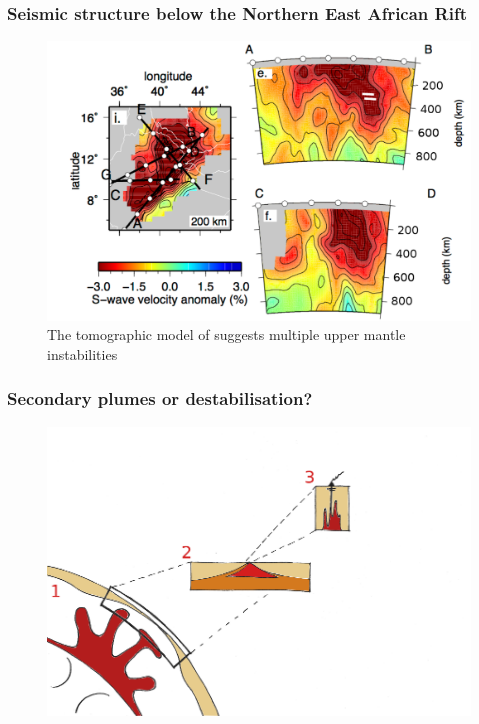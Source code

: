 \documentclass[aspectratio=169]{beamer}
\begin{document}
\begin{frame}
    \frametitle{Seismic structure below the Northern East African Rift}
    \begin{figure}
        \vspace{-0.3cm}
        \includegraphics[height=0.7\paperheight]{./figures/chiara1.png}
        \caption{The tomographic model of \cite{civiero-etal-2016} suggests multiple upper mantle instabilities}
    \end{figure}
\end{frame}

\begin{frame}
    \frametitle{Secondary plumes or destabilisation?}
    \begin{figure}
        \includegraphics[height=0.9\paperheight]{./pictures/drawing.png}
    \end{figure}
\end{frame}
\end{document}
